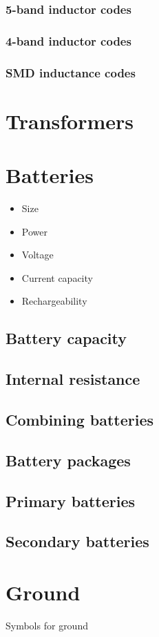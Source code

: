 \documentclass{report}
\begin{document}
\subsubsection{5-band inductor codes}
\subsubsection{4-band inductor codes}
\subsubsection{SMD inductance codes}
\section{Transformers}
\section{Batteries}
\begin{itemize}
\item Size
\item Power
\item Voltage
\item Current capacity
\item Rechargeability
\end{itemize}
\subsection{Battery capacity}
\subsection{Internal resistance}
\subsection{Combining batteries}
\subsection{Battery packages}
\subsection{Primary batteries}
\subsection{Secondary batteries}

\section{Ground}
Symbols for ground
\end{document}
